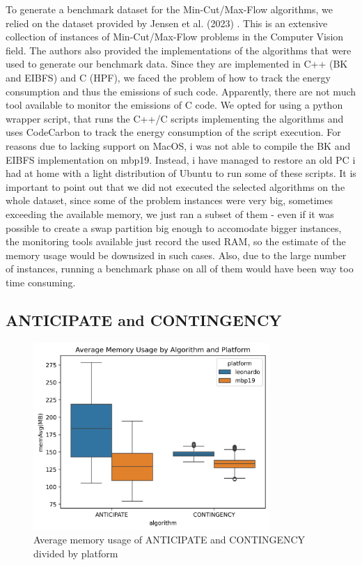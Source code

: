 \documentclass[a4paper,singleside,12pt]{report} %
\begin{document}
To generate a benchmark dataset for the Min-Cut/Max-Flow algorithms, we relied on the dataset provided by Jensen et al. (2023) \cite{Jensen2023Maxflow}. This is an extensive collection of instances
of Min-Cut/Max-Flow problems in the Computer Vision field. The authors also provided the implementations of the algorithms that were used to generate our benchmark data.
Since they are implemented in C++ (BK and EIBFS) and C (HPF), we faced the problem of how to track the energy consumption and thus the emissions of such code. Apparently,
there are not much tool available to monitor the emissions of C code. %
We opted for using a python wrapper script, that runs the C++/C scripts implementing the algorithms and uses CodeCarbon to track the energy consumption of the script execution.
For reasons due to lacking support on MacOS, i was not able to compile the BK and EIBFS implementation on mbp19. Instead, i have managed to restore an old PC i had at home 
with a light distribution of Ubuntu to run some of these scripts. 
It is important to point out that we did not executed the selected algorithms on the whole dataset, since some of the problem instances were very big, sometimes exceeding the available memory,
we just ran a subset of them - even if it was possible to create a swap partition big enough to accomodate bigger instances, the monitoring tools available just record the 
used RAM, so the estimate of the memory usage would be downsized in such cases. Also, due to the large number of instances, running a benchmark phase on all of them would have
been way too time consuming. 

\subsection{ANTICIPATE and CONTINGENCY}


\begin{figure}[h!]
    \centering
    \includegraphics[width=0.8\textwidth]{imgs/avg_mem_usage.png}
    \caption{Average memory usage of ANTICIPATE and CONTINGENCY divided by platform}
    \label{fig:ant_cont_avg_mem_usage}
\end{figure}
\end{document}

